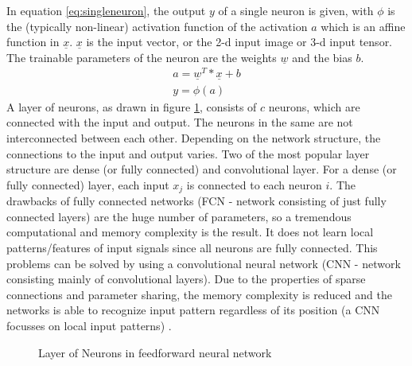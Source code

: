 \documentclass[12pt,DIV14,BCOR12mm,a4paper,footexclude,headinclude,halfparskip-,twoside,openright,openany,cleardoubleempty,idxtotoc,bibtotoc]{scrreprt} %
\numberwithin{equation}{chapter}
\begin{document}
In equation \ref{eq:singleneuron}, the output $y$ of a single neuron is given, with $\phi$ is the (typically non-linear) activation function of the activation $a$ which is an affine function in $\underline{x}$. $\underline{x}$ is the input vector, or the 2-d input image or 3-d input tensor. The trainable parameters of the neuron are the weights $\underline{w}$ and the bias $b$.
\begin{align}
	a = \underline{w}{^T}*\underline{x}+b\\
	y = \phi(a) \label{eq:singleneuron}
\end{align}
A layer of neurons, as drawn in figure \ref{fig:Layer_of_neurons}, consists of $c$ neurons, which are connected with the input and output. The neurons in the same are not interconnected between each other. Depending on the network structure, the connections to the input and output varies. Two of the most popular layer structure are dense (or fully connected) and convolutional layer. For a dense (or fully connected) layer, each input $x_{j}$ is connected to each neuron $i$. The drawbacks of fully connected networks (FCN - network consisting of just fully connected layers) are the huge number of parameters, so a tremendous computational and memory complexity is the result. It does not learn local patterns/features of input signals since all neurons are fully connected. This problems can be solved by using a convolutional neural network (CNN - network consisting mainly of convolutional layers). Due to the properties of sparse connections and parameter sharing, the memory complexity is reduced and the networks is able to recognize input pattern regardless of its position (a CNN focusses on local input patterns) \cite{LectureNotes_DeepLearning}.
\begin{figure}[htb!]
	\centering
	\qquad
	\caption{Layer of Neurons in feedforward neural network}
	\label{fig:Layer_of_neurons}
\end{figure}
\end{document}
